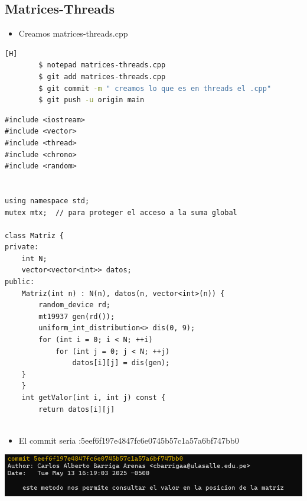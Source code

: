 \documentclass{article}
\begin{document}
	
	\subsection{Matrices-Threads}
	\begin{itemize}	
		\item Creamos matrices-threads.cpp\end{itemize}	
		
	\begin{lstlisting}[language=bash,caption={Creamos en threads }][H]
		$ notepad matrices-threads.cpp
		$ git add matrices-threads.cpp
		$ git commit -m " creamos lo que es en threads el .cpp"
		$ git push -u origin main
	\end{lstlisting}
        \begin{lstlisting}
#include <iostream>
#include <vector>
#include <thread>
#include <chrono>
#include <random>


using namespace std;
mutex mtx;  // para proteger el acceso a la suma global

class Matriz {
private:
    int N;
    vector<vector<int>> datos;
public:
    Matriz(int n) : N(n), datos(n, vector<int>(n)) {
        random_device rd;
        mt19937 gen(rd());
        uniform_int_distribution<> dis(0, 9);
        for (int i = 0; i < N; ++i)
            for (int j = 0; j < N; ++j)
                datos[i][j] = dis(gen);
    }
    }
    int getValor(int i, int j) const {
        return datos[i][j]
    
	\end{lstlisting}
	\begin{itemize}	
		\item El commit seria :5eef6f197e4847fc6e0745b57c1a57a6bf747bb0
	\end{itemize}	

	\includegraphics[width=1\textwidth]{img/commit_3.png}
\end{document}
